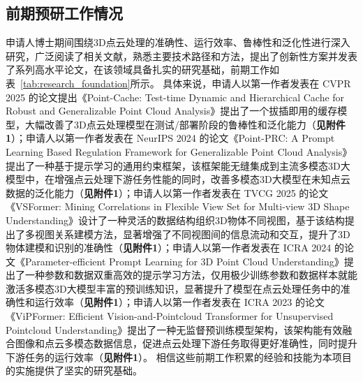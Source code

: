 \documentclass[12pt]{article}
\begin{document}
\subsection{前期预研工作情况}

申请人博士期间围绕3D点云处理的准确性、运行效率、鲁棒性和泛化性进行深入研究，广泛阅读了相关文献，熟悉主要技术路径和方法，提出了创新性方案并发表了系列高水平论文，在该领域具备扎实的研究基础，前期工作如表~\ref{tab:research_foundation}所示。
具体来说，申请人以第一作者发表在 CVPR 2025 的论文提出《Point-Cache: Test-time Dynamic and Hierarchical Cache for Robust and Generalizable Point Cloud Analysis》提出了一个拔插即用的缓存模型，大幅改善了3D点云处理模型在测试/部署阶段的鲁棒性和泛化能力（\textbf{见附件1}）；申请人以第一作者发表在 NeurIPS 2024 的论文《Point-PRC: A Prompt Learning Based Regulation Framework for Generalizable Point Cloud Analysis》提出了一种基于提示学习的通用约束框架，该框架能无缝集成到主流多模态3D大模型中，在增强点云处理下游任务性能的同时，改善多模态3D大模型在未知点云数据的泛化能力（\textbf{见附件1}）；申请人以第一作者发表在 TVCG 2025 的论文《VSFormer: Mining Correlations in Flexible View Set for Multi-view 3D Shape Understanding》设计了一种灵活的数据结构组织3D物体不同视图，基于该结构提出了多视图关系建模方法，显著增强了不同视图间的信息流动和交互，提升了3D物体建模和识别的准确性（\textbf{见附件1}）；申请人以第一作者发表在 ICRA 2024 的论文《Parameter-efficient Prompt Learning for 3D Point Cloud Understanding》提出了一种参数和数据双重高效的提示学习方法，仅用极少训练参数和数据样本就能激活多模态3D大模型丰富的预训练知识，显著提升了模型在点云处理任务中的准确性和运行效率（\textbf{见附件1}）；申请人以第一作者发表在 ICRA 2023 的论文《ViPFormer: Efficient Vision-and-Pointcloud Transformer for Unsupervised Pointcloud Understanding》提出了一种无监督预训练模型架构，该架构能有效融合图像和点云多模态数据信息，促进点云处理下游任务取得更好准确性，同时提升下游任务的运行效率（\textbf{见附件1}）。
相信这些前期工作积累的经验和技能为本项目的实施提供了坚实的研究基础。
\end{document}

